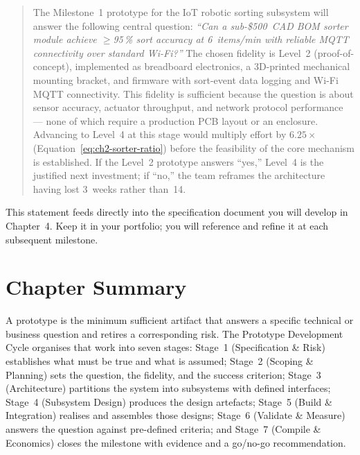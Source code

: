 \begin{quote}
The Milestone~1 prototype for the IoT robotic sorting subsystem will answer
the following central question: \emph{``Can a sub-\$500~CAD BOM sorter
module achieve $\geq$95\,\% sort accuracy at 6~items/min with reliable MQTT
connectivity over standard Wi-Fi?''}
The chosen fidelity is Level~2 (proof-of-concept), implemented as breadboard
electronics, a 3D-printed mechanical mounting bracket, and firmware with
sort-event data logging and Wi-Fi MQTT connectivity.
This fidelity is sufficient because the question is about sensor accuracy,
actuator throughput, and network protocol performance --- none of which
require a production PCB layout or an enclosure.
Advancing to Level~4 at this stage would multiply effort by $6.25\times$
(Equation~\ref{eq:ch2-sorter-ratio}) before the feasibility of the core
mechanism is established.
If the Level~2 prototype answers ``yes,'' Level~4 is the justified next
investment; if ``no,'' the team reframes the architecture having lost
3~weeks rather than~14.
\end{quote}

This statement feeds directly into the specification document you will
develop in Chapter~4.
Keep it in your portfolio; you will reference and refine it at each
subsequent milestone.

\section*{Chapter Summary}
\label{sec:ch2-summary}


A prototype is the minimum sufficient artifact that answers a specific
technical or business question and retires a corresponding risk.
The Prototype Development Cycle organises that work into seven stages:
Stage~1 (Specification \& Risk) establishes what must be true and what is
assumed; Stage~2 (Scoping \& Planning) sets the question, the fidelity,
and the success criterion; Stage~3 (Architecture) partitions the system
into subsystems with defined interfaces; Stage~4 (Subsystem Design) produces
the design artefacts; Stage~5 (Build \& Integration) realises and assembles
those designs; Stage~6 (Validate \& Measure) answers the question against
pre-defined criteria; and Stage~7 (Compile \& Economics) closes the milestone
with evidence and a go/no-go recommendation.

